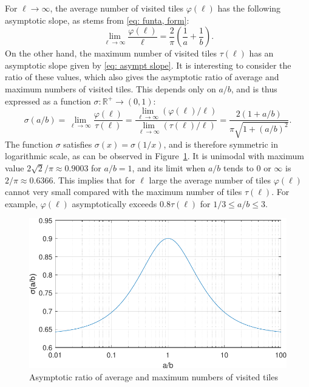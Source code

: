 \documentclass[12pt, a4paper]{article}
\newcommand{\funt}{\tau} %
\newcommand{\funta}{\varphi} %
\newcommand{\ras}{\sigma}
\newcommand{\len}{\ell} %
\begin{document}
For $\len \rightarrow \infty$, the average number of visited tiles $\funta(\len)$ has the following asymptotic slope, as stems from \eqref{eq: funta, form}:
\begin{equation}
\label{eq: asympt slope ave}
\lim_{\len \rightarrow \infty} \frac{\funta(\len)}{\len} = \frac 2 \pi \left(\frac 1 a + \frac 1 b \right).
\end{equation}
On the other hand, the maximum number of visited tiles $\funt(\len)$ has an asymptotic slope given by \eqref{eq: asympt slope}. It is interesting to consider the ratio of these values, which also gives the asymptotic ratio of average and maximum numbers of visited tiles. This depends only on $a/b$, and is thus expressed as a function $\ras: \mathbb R^+ \to (0,1)$:
\begin{equation}
\label{eq: ras}
\ras(a/b) = \lim_{\len \rightarrow \infty}
\frac { \funta(\len) } { \funt(\len) }
= \frac
{ \lim_{\len \rightarrow \infty} (\funta(\len)/\len) }
{ \lim_{\len \rightarrow \infty} (\funt(\len)/\len) }
= \frac{2\left(1 + a/b\right)}{\pi\sqrt{1 + \left(a/b\right)^2}}.
\end{equation}
The function $\ras$ satisfies $\ras(x) = \ras(1/x)$, and is therefore symmetric in logarithmic scale, as can be observed in Figure~\ref{fig: ratio asympt slopes}. It is unimodal with maximum value $2\sqrt 2/\pi \approx 0.9003$ for $a/b=1$, and its limit when $a/b$ tends to $0$ or $\infty$ is $2/\pi \approx 0.6366$. This implies that for $\len$ large the average number of tiles $\funta(\len)$ cannot very small compared with the maximum number of tiles $\funt(\len)$. For example, $\funta(\len)$ asymptotically exceeds $0.8\funt(\len)$ for $1/3 \leq a/b \leq 3$.

\begin{figure}
\centering%
\includegraphics[width=.7\textwidth]{ratio_asympt_slopes}%
\caption{Asymptotic ratio of average and maximum numbers of visited tiles
}%
\label{fig: ratio asympt slopes}%
\end{figure}%
\end{document}

